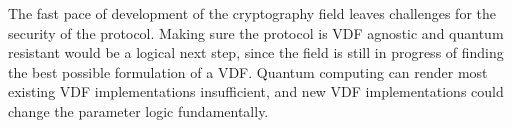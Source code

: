 The fast pace of development of the cryptography field leaves challenges for the security of the protocol. Making sure the protocol is VDF agnostic and quantum resistant would be a logical next step, since the field is still in progress of finding the best possible formulation of a VDF. Quantum computing can render most existing VDF implementations insufficient, and new VDF implementations could change the parameter logic fundamentally.
